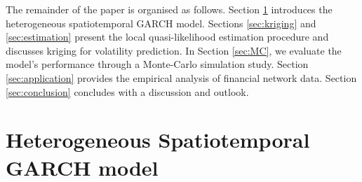 \documentclass[fleqn,11pt]{article}
\begin{document}
The remainder of the paper is organised as follows. Section \ref{sec:theory} introduces the heterogeneous spatiotemporal GARCH model. Sections \ref{sec:kriging} and \ref{sec:estimation} present the local quasi-likelihood estimation procedure and discusses kriging for volatility prediction. In Section \ref{sec:MC}, we evaluate the model's performance through a Monte-Carlo simulation study. Section \ref{sec:application} provides the empirical analysis of financial network data. Section \ref{sec:conclusion} concludes with a discussion and outlook.



\section{Heterogeneous Spatiotemporal GARCH model}\label{sec:theory}
\end{document}
